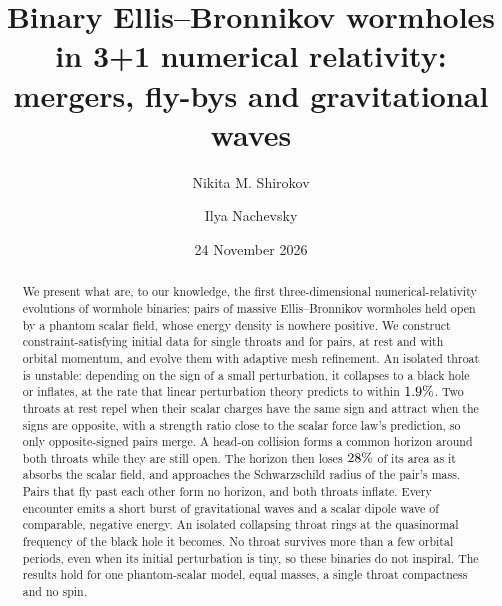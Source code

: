 \documentclass[twocolumn,floatfix,aps,prd,superscriptaddress,nofootinbib,showkeys]{revtex4-2}
\begin{document}
\title{\texorpdfstring{Binary Ellis--Bronnikov wormholes in 3+1 numerical relativity: mergers, fly-bys and gravitational waves}{Binary Ellis-Bronnikov wormholes in 3+1 numerical relativity: mergers, fly-bys and gravitational waves}}

\author{Nikita M. Shirokov}
\author{Ilya Nachevsky}
\date{24 November 2026}


\begin{abstract}
We present what are, to our knowledge, the first three-dimensional numerical-relativity evolutions of wormhole binaries: pairs of massive Ellis--Bronnikov wormholes held open by a phantom scalar field, whose energy density is nowhere positive. We construct constraint-satisfying initial data for single throats and for pairs, at rest and with orbital momentum, and evolve them with adaptive mesh refinement. An isolated throat is unstable: depending on the sign of a small perturbation, it collapses to a black hole or inflates, at the rate that linear perturbation theory predicts to within $1.9\%$. Two throats at rest repel when their scalar charges have the same sign and attract when the signs are opposite, with a strength ratio close to the scalar force law's prediction, so only opposite-signed pairs merge. A head-on collision forms a common horizon around both throats while they are still open. The horizon then loses $28\%$ of its area as it absorbs the scalar field, and approaches the Schwarzschild radius of the pair's mass. Pairs that fly past each other form no horizon, and both throats inflate. Every encounter emits a short burst of gravitational waves and a scalar dipole wave of comparable, negative energy. An isolated collapsing throat rings at the quasinormal frequency of the black hole it becomes. No throat survives more than a few orbital periods, even when its initial perturbation is tiny, so these binaries do not inspiral. The results hold for one phantom-scalar model, equal masses, a single throat compactness and no spin.
\end{abstract}


\maketitle
\end{document}
